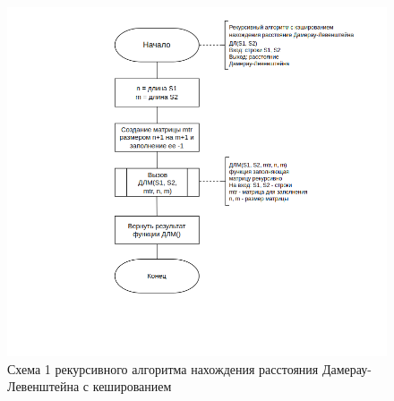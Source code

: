 \begin{figure}[h]
	\centering
	\includegraphics[width=\textwidth]{img/dlrechash1.png}
	\caption{Схема 1 рекурсивного алгоритма нахождения расстояния Дамерау-Левенштейна с кешированием}
	\label{fig:DLrechash1}
\end{figure}

\clearpage


